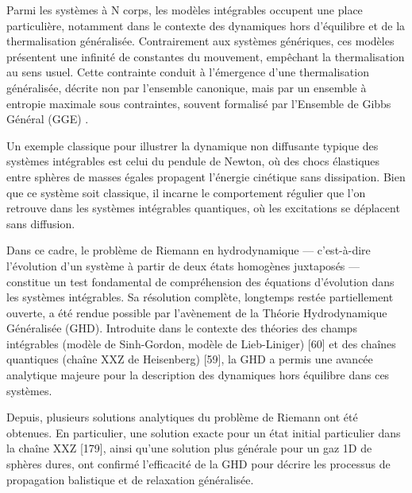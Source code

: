 
Parmi les systèmes à N corps, les modèles intégrables occupent une place particulière, notamment dans le contexte des dynamiques hors d’équilibre et de la thermalisation généralisée. Contrairement aux systèmes génériques, ces modèles présentent une infinité de constantes du mouvement, empêchant la thermalisation au sens usuel. Cette contrainte conduit à l’émergence d’une thermalisation généralisée, décrite non par l’ensemble canonique, mais par un ensemble à entropie maximale sous contraintes, souvent formalisé par l’Ensemble de Gibbs Général (GGE) .

Un exemple classique pour illustrer la dynamique non diffusante typique des systèmes intégrables est celui du pendule de Newton, où des chocs élastiques entre sphères de masses égales propagent l’énergie cinétique sans dissipation. Bien que ce système soit classique, il incarne le comportement régulier que l’on retrouve dans les systèmes intégrables quantiques, où les excitations se déplacent sans diffusion.

Dans ce cadre, le problème de Riemann en hydrodynamique — c’est-à-dire l’évolution d’un système à partir de deux états homogènes juxtaposés — constitue un test fondamental de compréhension des équations d’évolution dans les systèmes intégrables. Sa résolution complète, longtemps restée partiellement ouverte, a été rendue possible par l’avènement de la Théorie Hydrodynamique Généralisée (GHD). Introduite dans le contexte des théories des champs intégrables (modèle de Sinh-Gordon, modèle de Lieb-Liniger) [60] et des chaînes quantiques (chaîne XXZ de Heisenberg) [59], la GHD a permis une avancée analytique majeure pour la description des dynamiques hors équilibre dans ces systèmes.

Depuis, plusieurs solutions analytiques du problème de Riemann ont été obtenues. En particulier, une solution exacte pour un état initial particulier dans la chaîne XXZ [179], ainsi qu’une solution plus générale pour un gaz 1D de sphères dures, ont confirmé l’efficacité de la GHD pour décrire les processus de propagation balistique et de relaxation généralisée.

